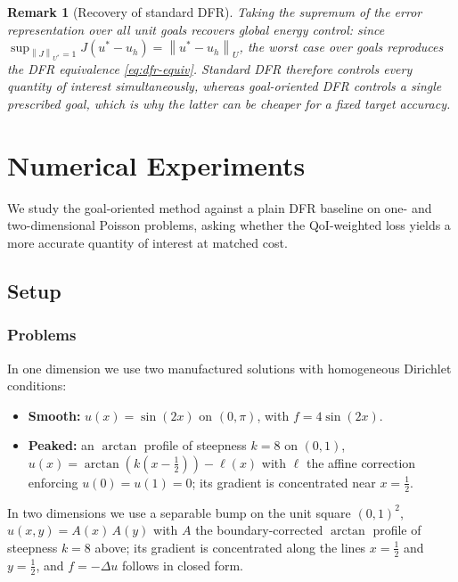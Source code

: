 \documentclass[preprint,11pt]{elsarticle}
\newtheorem{remark}[theorem]{Remark}
\newcommand{\norm}[1]{\left\|#1\right\|}
\begin{document}
\begin{remark}[Recovery of standard DFR]
Taking the supremum of the error representation over all unit goals recovers global energy control: since $\sup_{\norm{J}_{U^*} = 1} J(u^* - u_h) = \norm{u^* - u_h}_U$, the worst case over goals reproduces the DFR equivalence \eqref{eq:dfr-equiv}. Standard DFR therefore controls every quantity of interest simultaneously, whereas goal-oriented DFR controls a single prescribed goal, which is why the latter can be cheaper for a fixed target accuracy.
\end{remark}

\section{Numerical Experiments}
\label{sec:experiments}

We study the goal-oriented method against a plain DFR baseline on one- and two-dimensional Poisson problems, asking whether the QoI-weighted loss yields a more accurate quantity of interest at matched cost.

\subsection{Setup}

\subsubsection{Problems}

In one dimension we use two manufactured solutions with homogeneous Dirichlet conditions:
\begin{itemize}
    \item \textbf{Smooth:} $u(x) = \sin(2x)$ on $(0, \pi)$, with $f = 4\sin(2x)$.
    \item \textbf{Peaked:} an $\arctan$ profile of steepness $k = 8$ on $(0,1)$, $u(x) = \arctan(k(x - \frac{1}{2})) - \ell(x)$ with $\ell$ the affine correction enforcing $u(0) = u(1) = 0$; its gradient is concentrated near $x = \frac{1}{2}$.
\end{itemize}
In two dimensions we use a separable bump on the unit square $(0,1)^2$, $u(x,y) = A(x)\,A(y)$ with $A$ the boundary-corrected $\arctan$ profile of steepness $k = 8$ above; its gradient is concentrated along the lines $x = \frac{1}{2}$ and $y = \frac{1}{2}$, and $f = -\Delta u$ follows in closed form.
\end{document}

